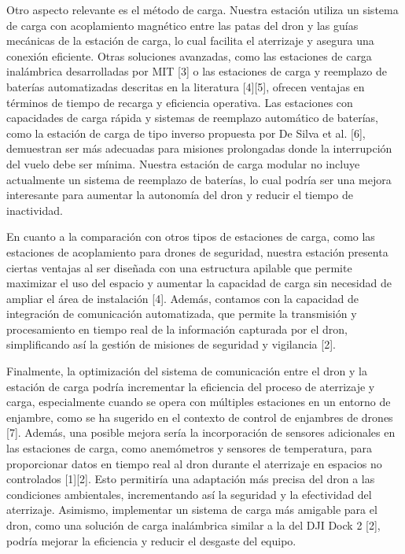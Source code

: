 Otro aspecto relevante es el método de carga. Nuestra estación utiliza un sistema de carga con acoplamiento magnético entre las patas del dron y las guías mecánicas de la estación de carga, lo cual facilita el aterrizaje y asegura una conexión eficiente. Otras soluciones avanzadas, como las estaciones de carga inalámbrica desarrolladas por MIT [3] o las estaciones de carga y reemplazo de baterías automatizadas descritas en la literatura [4][5], ofrecen ventajas en términos de tiempo de recarga y eficiencia operativa. Las estaciones con capacidades de carga rápida y sistemas de reemplazo automático de baterías, como la estación de carga de tipo inverso propuesta por De Silva et al. [6], demuestran ser más adecuadas para misiones prolongadas donde la interrupción del vuelo debe ser mínima. Nuestra estación de carga modular no incluye actualmente un sistema de reemplazo de baterías, lo cual podría ser una mejora interesante para aumentar la autonomía del dron y reducir el tiempo de inactividad.

En cuanto a la comparación con otros tipos de estaciones de carga, como las estaciones de acoplamiento para drones de seguridad, nuestra estación presenta ciertas ventajas al ser diseñada con una estructura apilable que permite maximizar el uso del espacio y aumentar la capacidad de carga sin necesidad de ampliar el área de instalación [4]. Además, contamos con la capacidad de integración de comunicación automatizada, que permite la transmisión y procesamiento en tiempo real de la información capturada por el dron, simplificando así la gestión de misiones de seguridad y vigilancia [2].

Finalmente, la optimización del sistema de comunicación entre el dron y la estación de carga podría incrementar la eficiencia del proceso de aterrizaje y carga, especialmente cuando se opera con múltiples estaciones en un entorno de enjambre, como se ha sugerido en el contexto de control de enjambres de drones [7]. Además, una posible mejora sería la incorporación de sensores adicionales en las estaciones de carga, como anemómetros y sensores de temperatura, para proporcionar datos en tiempo real al dron durante el aterrizaje en espacios no controlados [1][2]. Esto permitiría una adaptación más precisa del dron a las condiciones ambientales, incrementando así la seguridad y la efectividad del aterrizaje. Asimismo, implementar un sistema de carga más amigable para el dron, como una solución de carga inalámbrica similar a la del DJI Dock 2 [2], podría mejorar la eficiencia y reducir el desgaste del equipo.

